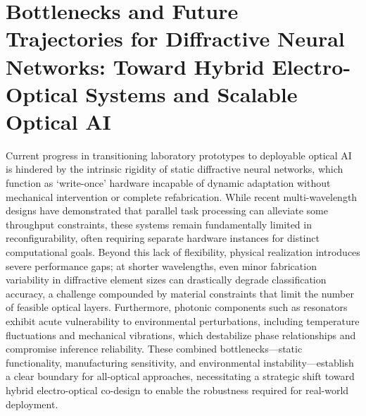 \documentclass[11pt]{article}
\begin{document}
\section{Bottlenecks and Future Trajectories for Diffractive Neural Networks: Toward Hybrid Electro-Optical Systems and Scalable Optical AI}\label{bottlenecks-and-future-trajectories-for-diffractive-neural-networks-toward-hybrid-electro-optical-systems-and-scalable-optical-ai}

Current progress in transitioning laboratory prototypes to deployable optical AI is hindered by the intrinsic rigidity of static diffractive neural networks, which function as `write-once' hardware incapable of dynamic adaptation without mechanical intervention or complete refabrication. While recent multi-wavelength designs have demonstrated that parallel task processing can alleviate some throughput constraints, these systems remain fundamentally limited in reconfigurability, often requiring separate hardware instances for distinct computational goals. Beyond this lack of flexibility, physical realization introduces severe performance gaps; at shorter wavelengths, even minor fabrication variability in diffractive element sizes can drastically degrade classification accuracy, a challenge compounded by material constraints that limit the number of feasible optical layers. \citep{doi_10_1109_tmag_2023_3281842_3e98eb7f} Furthermore, photonic components such as resonators exhibit acute vulnerability to environmental perturbations, including temperature fluctuations and mechanical vibrations, which destabilize phase relationships and compromise inference reliability. These combined bottlenecks---static functionality, manufacturing sensitivity, and environmental instability---establish a clear boundary for all-optical approaches, necessitating a strategic shift toward hybrid electro-optical co-design to enable the robustness required for real-world deployment. \citep{doi_10_1515_nanoph_2022_0615_9a3be8d6} \citep{doi_10_1002_adpr_202300310_6647aa64} \citep{doi_10_3390_nano14080697_c372a140} \citep{doi_10_1002_nap2_70185_56c8ab30}
\end{document}
